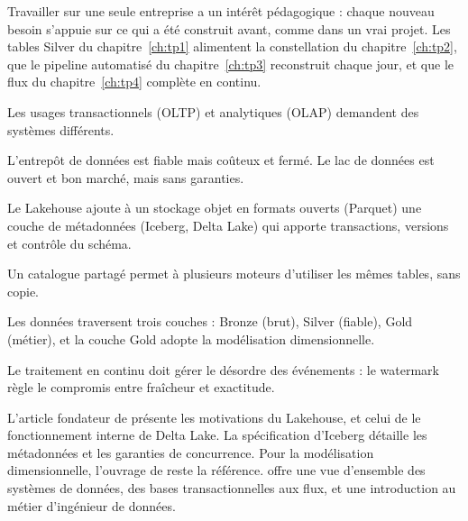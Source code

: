 Travailler sur une seule entreprise a un intérêt pédagogique : chaque nouveau besoin s'appuie sur
ce qui a été construit avant, comme dans un vrai projet. Les tables Silver du chapitre~\ref{ch:tp1}
alimentent la constellation du chapitre~\ref{ch:tp2}, que le pipeline automatisé du
chapitre~\ref{ch:tp3} reconstruit chaque jour, et que le flux du chapitre~\ref{ch:tp4} complète en
continu.

\begin{aretenir}
  \item Les usages transactionnels (OLTP) et analytiques (OLAP) demandent des systèmes différents.
  \item L'entrepôt de données est fiable mais coûteux et fermé. Le lac de données est ouvert et bon
        marché, mais sans garanties.
  \item Le Lakehouse ajoute à un stockage objet en formats ouverts (Parquet) une couche de
        métadonnées (Iceberg, Delta Lake) qui apporte transactions, versions et contrôle du schéma.
  \item Un catalogue partagé permet à plusieurs moteurs d'utiliser les mêmes tables, sans copie.
  \item Les données traversent trois couches : Bronze (brut), Silver (fiable), Gold (métier), et la
        couche Gold adopte la modélisation dimensionnelle.
  \item Le traitement en continu doit gérer le désordre des événements : le watermark règle le
        compromis entre fraîcheur et exactitude.
\end{aretenir}

\begin{plusloin}
L'article fondateur de \citet{armbrust2021} présente les motivations du Lakehouse, et celui de
\citet{armbrust2020} le fonctionnement interne de Delta Lake. La spécification d'Iceberg
\citep{icebergspec} détaille les métadonnées et les garanties de concurrence. Pour la modélisation
dimensionnelle, l'ouvrage de \citet{kimball2013} reste la référence. \citet{kleppmann2017} offre
une vue d'ensemble des systèmes de données, des bases transactionnelles aux flux, et
\citet{reis2022} une introduction au métier d'ingénieur de données.
\end{plusloin}
